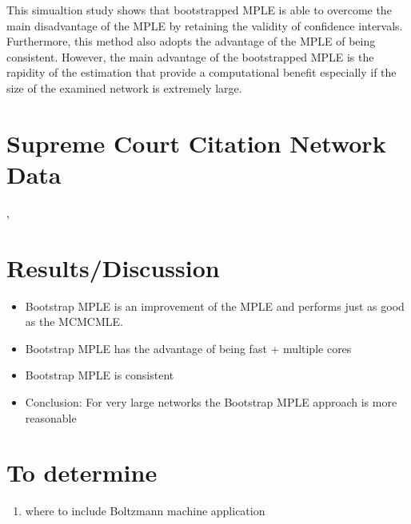 \documentclass[headsepline=true, abstracton]{scrartcl}
\begin{document}
\noindent This simualtion study shows that bootstrapped MPLE is able to overcome the main disadvantage of the MPLE by retaining the validity of confidence intervals. Furthermore, this method also adopts the advantage of the MPLE of being consistent. However, the main advantage of the bootstrapped MPLE is the rapidity of the estimation that provide a computational benefit especially if the size of the examined network is extremely large.

\section*{Supreme Court Citation Network Data}

\cite{FowlerJeon2008}, \cite{Fowleretal2007}
 
 \section*{Results/Discussion}
\begin{itemize}
  
 \item  Bootstrap MPLE is an improvement of the MPLE and performs just as good as the MCMCMLE. \\
\item Bootstrap MPLE has the advantage of being fast + multiple cores\\ 
\item Bootstrap MPLE is consistent\\
\item Conclusion: For very large networks the Bootstrap MPLE approach is more reasonable
   
\end{itemize}


 \section*{To determine}
 
 \begin{enumerate}
 \item where to include Boltzmann machine application
\end{enumerate}   
   
   
\newpage


 

\end{document}

